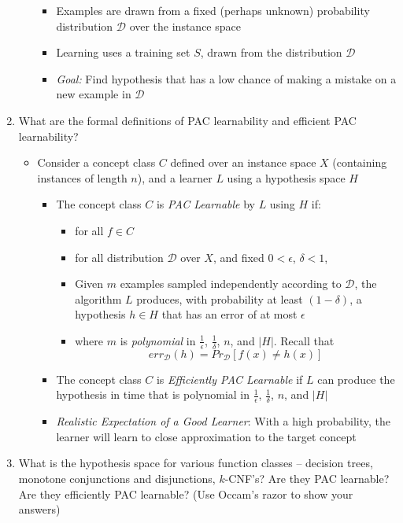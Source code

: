 \documentclass{article}
\newcommand{\abs}[1]{\left| #1\right|}
\renewcommand{\dim}{\mathcal{D}}
\begin{document}
\begin{enumerate}
\begin{itemize}
\begin{center}
{\begin{itemize}[topsep=0pt,itemsep=-2pt,leftmargin=13pt]
\item Examples are drawn from a fixed (perhaps unknown) probability distribution $\mathcal{D}$ over the instance space
\item Learning uses a training set $S$, drawn from the distribution $\mathcal{D}$
\item {\em Goal:} Find hypothesis that has a low chance of making a mistake on a new example in $\mathcal{D}$
\end{itemize}
}
\end{center}
\end{itemize}
\item What are the formal definitions of PAC learnability and efficient PAC learnability?

\begin{itemize}
\item Consider a concept class $C$ defined over an instance space $X$ (containing instances of length $n$), and a learner $L$ using a hypothesis space $H$
\begin{itemize}
\item The concept class $C$ is {\em PAC Learnable} by $L$ using $H$ if:
\begin{itemize}
\item for all $f\in C$
\item for all distribution $\dim$ over $X$, and fixed $0<\epsilon$, $\delta<1$,
\item Given $m$ examples sampled independently according to $\dim$, the algorithm $L$ produces, with probability at least $(1-\delta)$, a hypothesis $h\in H$ that has an error of at most $\epsilon$
\item where $m$ is {\em polynomial} in $\frac{1}{\epsilon}$, $\frac{1}{\delta}$, $n$, and $\abs{H}$. Recall that
\[
err_{\dim}(h) = Pr_{\dim}[f(x)\neq h(x)]
\]
\end{itemize}
\item The concept class $C$ is {\em Efficiently PAC Learnable} if $L$ can produce the hypothesis in time that is polynomial in $\frac{1}{\epsilon}$, $\frac{1}{\delta}$, $n$, and $\abs{H}$
\item {\em Realistic Expectation of a Good Learner}: With a high probability, the learner will learn to close approximation to the target concept
\end{itemize}
\end{itemize}



\item What is the hypothesis space for various function classes -- decision trees, monotone conjunctions and disjunctions, $k$-CNF's? Are they PAC learnable? Are they efficiently PAC learnable? (Use Occam's razor to show your answers)


\end{enumerate}
\end{document}
